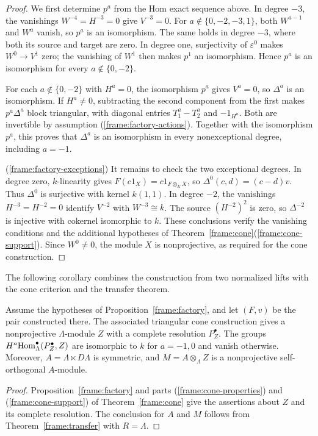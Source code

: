 \documentclass[11pt]{article}
\begin{document}
\begin{proof}
We first determine $p^a$ from the Hom exact sequence above. In degree $-3$, the vanishings $W^{-4}=H^{-3}=0$ give $V^{-3}=0$. For $a\notin\{0,-2,-3,1\}$, both $W^{a-1}$ and $W^a$ vanish, so $p^a$ is an isomorphism.
The same holds in degree $-3$, where both its source and target are zero. In degree one, surjectivity of $\varepsilon^0$ makes $W^0\to V^1$ zero; the vanishing of $W^1$ then makes $p^1$ an isomorphism. Hence $p^a$ is an isomorphism for every $a\notin\{0,-2\}$.

For each $a\notin\{0,-2\}$ with $H^a=0$, the isomorphism $p^a$ gives $V^a=0$, so $\Delta^a$ is an isomorphism. If $H^a\ne0$, subtracting the second component from the first makes $p^a\Delta^a$ block triangular, with diagonal entries $T_1^a-T_2^a$ and $-1_{H^a}$. Both are invertible by
assumption \textup{(\ref{frame:factory-actions})}. Together with the isomorphism $p^a$, this proves that
$\Delta^a$ is an isomorphism in every nonexceptional degree,
including $a=-1$.

\textup{(\ref{frame:factory-exceptions})}
It remains to check the two exceptional degrees.
In degree zero, $k$-linearity gives
$F(c1_X)=c1_{F\otimes_E X}$, so $\Delta^0(c,d)=(c-d)v$.
Thus $\Delta^0$ is surjective with kernel $k(1,1)$.
In degree $-2$, the vanishings $H^{-3}=H^{-2}=0$ identify
$V^{-2}$ with $W^{-3}\cong k$. The source $(H^{-2})^2$ is zero,
so $\Delta^{-2}$ is injective
with cokernel isomorphic to $k$.
These conclusions verify the vanishing conditions and the
additional hypotheses of
Theorem~\ref{frame:cone}\textup{(\ref{frame:cone-support})}.
Since $W^0\ne0$, the module $X$ is nonprojective, as required
for the cone construction.
\end{proof}

The following corollary combines the construction from two normalized
lifts with the cone criterion and the transfer theorem.

\begin{Koro}\label{frame:combined}
Assume the hypotheses of Proposition~\ref{frame:factory}, and let
$(F,v)$ be the pair constructed there. The associated triangular cone
construction gives a nonprojective $\Lambda$-module $Z$ with a complete
resolution $P_Z^\bullet$. The groups
$H^a{\rm Hom}_\Lambda^\bullet(P_Z^\bullet,Z)$ are isomorphic to $k$ for
$a=-1,0$ and vanish otherwise.
Moreover, $A=\Lambda\ltimes D\Lambda$ is symmetric, and
$M=A\otimes_\Lambda Z$ is a nonprojective self-orthogonal $A$-module.
\end{Koro}
\begin{proof}
Proposition~\ref{frame:factory} and parts
\textup{(\ref{frame:cone-properties}) and (\ref{frame:cone-support})}
of Theorem~\ref{frame:cone} give the assertions about $Z$ and its complete
resolution. The conclusion for $A$ and $M$ follows from
Theorem~\ref{frame:transfer} with $R=\Lambda$.
\end{proof}
\end{document}
